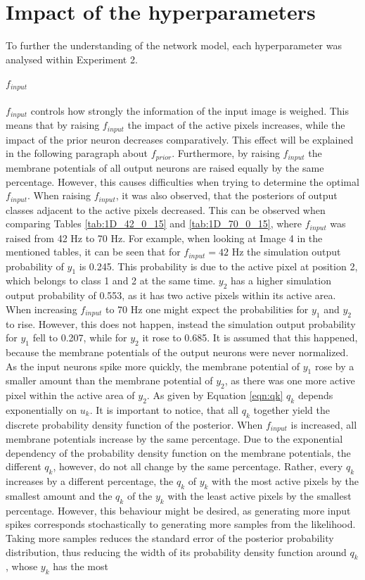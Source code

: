 \section{Impact of the hyperparameters}
\label{section:impactHyper}

To further the understanding of the network model, each hyperparameter was analysed within Experiment 2.

\paragraph{$f_{input}$} $f_{input}$ controls how strongly the information of the input image is weighed. This means that by raising $f_{input}$ the impact of the active pixels increases, while the impact of the prior neuron decreases comparatively. This effect will be explained in the following paragraph about $f_{prior}$. Furthermore, by raising $f_{input}$ the membrane potentials of all output neurons are raised equally by the same percentage. However, this causes difficulties when trying to determine the optimal $f_{input}$. When raising $f_{input}$, it was also observed, that the posteriors of output classes adjacent to the active pixels decreased. This can be observed when comparing Tables \ref{tab:1D_42_0_15} and \ref{tab:1D_70_0_15}, where $f_{input}$ was raised from 42 Hz to 70 Hz. For example, when looking at Image 4 in the mentioned tables, it can be seen that for $f_{input} = 42\text{ Hz}$ the simulation output probability of $y_1$ is 0.245. This probability is due to the active pixel at position 2, which belongs to class 1 and 2 at the same time. $y_2$ has a higher simulation output probability of 0.553, as it has two active pixels within its active area. When increasing $f_{input}$ to 70 Hz one might expect the probabilities for $y_1$ and $y_2$ to rise. However, this does not happen, instead the simulation output probability for $y_1$ fell to 0.207, while for $y_2$ it rose to 0.685. It is assumed that this happened, because the membrane potentials of the output neurons were never normalized. As the input neurons spike more quickly, the membrane potential of $y_1$ rose by a smaller amount than the membrane potential of $y_2$, as there was one more active pixel within the active area of $y_2$. As given by Equation \ref{eqn:qk} $q_k$ depends exponentially on $u_k$. It is important to notice, that all $q_k$ together yield the discrete probability density function of the posterior. When $f_{input}$ is increased, all membrane potentials increase by the same percentage. Due to the exponential dependency of the probability density function on the membrane potentials, the different $q_k$, however, do not all change by the same percentage. Rather, every $q_k$ increases by a different percentage, the $q_k$ of $y_k$ with the most active pixels by the smallest amount and the $q_k$ of the $y_k$ with the least active pixels by the smallest percentage. However, this behaviour might be desired, as generating more input spikes corresponds stochastically to generating more samples from the likelihood. Taking more samples reduces the standard error of the posterior probability distribution, thus reducing the width of its probability density function around $q_k$, whose $y_k$ has the most 